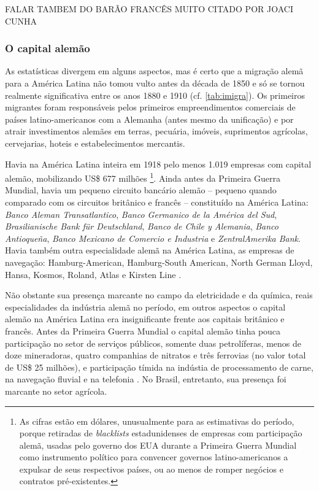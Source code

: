 FALAR TAMBEM DO BARÃO FRANCÊS MUITO CITADO POR JOACI CUNHA

\subsubsection{O capital alemão}\label{subsubsec:capale}

As estatísticas divergem em alguns aspectos, mas é certo que a migração alemã para a América Latina não tomou vulto antes da década de 1850 \cite[p.~65]{rippy_german_1948} e só se tornou realmente significativa entre os anos 1880 e 1910 (cf. \autoref{tab:imigra}). Os primeiros migrantes foram responsáveis pelos primeiros empreendimentos comerciais de países latino-americanos com a Alemanha (antes mesmo da unificação) e por atrair investimentos alemães em terras, pecuária, imóveis, suprimentos agrícolas, cervejarias, hoteis e estabelecimentos mercantis. 

Havia na América Latina inteira em 1918 pelo menos 1.019 empresas com capital alemão, mobilizando US\$ 677 milhões \cite[p.~64-65]{rippy_german_1948}\footnote{As cifras estão em dólares, unusualmente para as estimativas do período, porque retiradas de \textit{blacklists} estadunidenses de empresas com participação alemã, usadas pelo governo dos EUA durante a Primeira Guerra Mundial como instrumento político para convencer governos latino-americanos a expulsar de seus respectivos países, ou ao menos de romper negócios e contratos pré-existentes.}. Ainda antes da Primeira Guerra Mundial, havia um pequeno circuito bancário alemão -- pequeno quando comparado com os circuitos britânico e francês -- constituído na América Latina: \textit{Banco Aleman Transatlantico}, \textit{Banco Germanico de la América del Sud}, \textit{Brasilianische Bank für Deutschland}, \textit{Banco de Chile y Alemania}, \textit{Banco Antioqueña}, \textit{Banco Mexicano de Comercio e Industria} e \textit{ZentralAmerika Bank}. Havia também outra especialidade alemã na América Latina, as empresas de navegação: Hamburg-American, Hamburg-South American, North German Lloyd, Hansa, Kosmos, Roland, Atlas e Kirsten Line \cite{rippy_german_1948}.

Não obstante sua presença marcante no campo da eletricidade e da química, reais especialidades da indústria alemã no período, em outros aspectos o capital alemão na América Latina era insignificante frente aos capitais britânico e francês. Antes da Primeira Guerra Mundial o capital alemão tinha pouca participação no setor de serviços públicos, somente duas petrolíferas, menos de doze mineradoras, quatro companhias de nitratos e três ferrovias (no valor total de US\$ 25 milhões), e participação tímida na indústia de processamento de carne, na navegação fluvial e na telefonia \cite{rippy_german_1948}. No Brasil, entretanto, sua presença foi marcante no setor agrícola.

